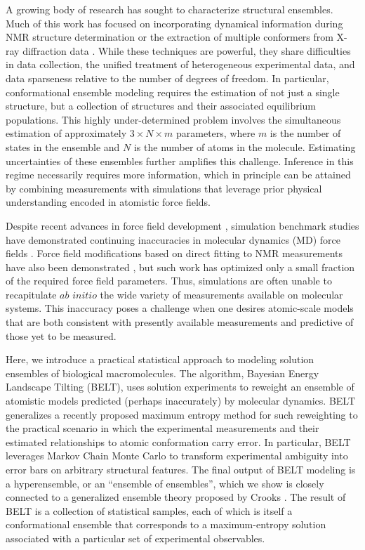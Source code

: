 \documentclass[journal=jacsat,manuscript=article]{achemso}
\begin{document}
A growing body of research has sought to characterize structural ensembles.  Much of this work has focused on incorporating dynamical information during NMR structure determination  \cite{lindorff2005simultaneous, lange2008recognition} or the extraction of multiple conformers from X-ray diffraction data  \cite{depristo2004heterogeneity, lang2010automated}.  While these techniques are powerful, they share difficulties in data collection, the unified treatment of heterogeneous experimental data, and data sparseness relative to the number of degrees of freedom.  In particular, conformational ensemble modeling requires the estimation of not just a single structure, but a collection of structures and their associated equilibrium populations.  This highly under-determined problem involves the simultaneous estimation of approximately $3 \times N \times m$ parameters, where $m$ is the number of states in the ensemble and $N$ is the number of atoms in the molecule. Estimating uncertainties of these ensembles further 
amplifies this challenge.  Inference in this regime necessarily requires more information, which in principle can be attained by combining measurements with simulations that leverage prior physical understanding encoded in atomistic force fields. 

Despite recent advances in force field development \cite{best2008, lindorff2012systematic}, simulation benchmark studies have demonstrated continuing inaccuracies in molecular dynamics (MD) force fields \cite{beauchamp2012protein}.  Force field modifications based on direct fitting to NMR measurements have also been demonstrated \cite{li2011iterative, best2012optimization, nerenberg2011}, but such work has optimized only a small fraction of the required force field parameters.  Thus, simulations are often unable to recapitulate $ab$ $initio$ the wide variety of measurements available on molecular systems.  This inaccuracy poses a challenge when one desires atomic-scale models that are both consistent with presently available measurements and predictive of those yet to be measured.  

Here, we introduce a practical statistical approach to modeling solution ensembles of biological macromolecules.  The algorithm, Bayesian Energy Landscape Tilting (BELT), uses solution experiments to reweight an ensemble of atomistic models predicted (perhaps inaccurately) by molecular dynamics.  BELT generalizes a recently proposed maximum entropy method for such reweighting \cite{chodera2012} to the practical scenario in which the experimental measurements and their estimated relationships to atomic conformation carry error. In particular, BELT leverages Markov Chain Monte Carlo \cite{patil2010pymc} to transform experimental ambiguity into error bars on arbitrary structural features. The final output of BELT modeling is a hyperensemble, or an ``ensemble of ensembles'', which we show is closely connected to a generalized ensemble theory proposed by Crooks \cite{crooks2007beyond}. The result of BELT is a collection of statistical samples, each of which is itself a conformational ensemble that corresponds to 
a maximum-entropy solution associated with a particular set of experimental observables. 
\end{document}
